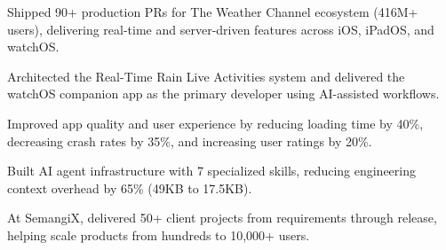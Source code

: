 \begin{zitemize}
\item Shipped 90+ production PRs for The Weather Channel ecosystem (416M+ users), delivering real-time and server-driven features across iOS, iPadOS, and watchOS.
\item Architected the Real-Time Rain Live Activities system and delivered the watchOS companion app as the primary developer using AI-assisted workflows.
\item Improved app quality and user experience by reducing loading time by 40\%, decreasing crash rates by 35\%, and increasing user ratings by 20\%.
\item Built AI agent infrastructure with 7 specialized skills, reducing engineering context overhead by 65\% (49KB to 17.5KB).
\item At SemangiX, delivered 50+ client projects from requirements through release, helping scale products from hundreds to 10,000+ users.
\end{zitemize}
